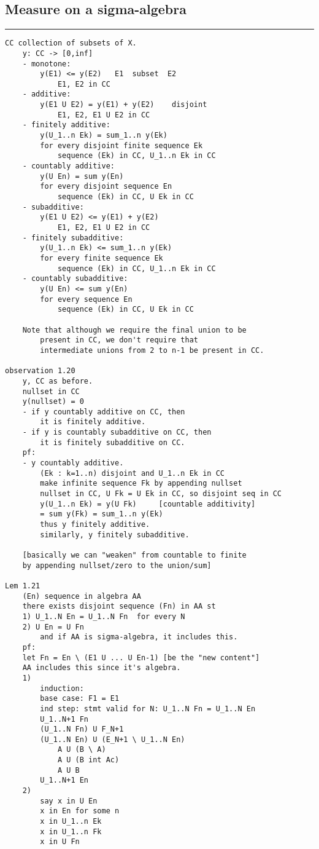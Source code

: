 \documentclass{article}
\begin{document}
\begin{flushleft}
\section*{Measure on a sigma-algebra}
\bigbreak
\hrule
\bigbreak

\begin{verbatim}
CC collection of subsets of X.
    y: CC -> [0,inf] 
    - monotone: 
        y(E1) <= y(E2)   E1  subset  E2 
            E1, E2 in CC
    - additive:
        y(E1 U E2) = y(E1) + y(E2)    disjoint
            E1, E2, E1 U E2 in CC
    - finitely additive: 
        y(U_1..n Ek) = sum_1..n y(Ek) 
        for every disjoint finite sequence Ek 
            sequence (Ek) in CC, U_1..n Ek in CC 
    - countably additive:
        y(U En) = sum y(En)
        for every disjoint sequence En 
            sequence (Ek) in CC, U Ek in CC 
    - subadditive: 
        y(E1 U E2) <= y(E1) + y(E2)
            E1, E2, E1 U E2 in CC
    - finitely subadditive:
        y(U_1..n Ek) <= sum_1..n y(Ek) 
        for every finite sequence Ek 
            sequence (Ek) in CC, U_1..n Ek in CC 
    - countably subadditive:
        y(U En) <= sum y(En)
        for every sequence En 
            sequence (Ek) in CC, U Ek in CC 

    Note that although we require the final union to be 
        present in CC, we don't require that 
        intermediate unions from 2 to n-1 be present in CC. 

observation 1.20
    y, CC as before.
    nullset in CC 
    y(nullset) = 0
    - if y countably additive on CC, then 
        it is finitely additive.
    - if y is countably subadditive on CC, then
        it is finitely subadditive on CC. 
    pf:
    - y countably additive. 
        (Ek : k=1..n) disjoint and U_1..n Ek in CC 
        make infinite sequence Fk by appending nullset 
        nullset in CC, U Fk = U Ek in CC, so disjoint seq in CC
        y(U_1..n Ek) = y(U Fk)     [countable additivity]
        = sum y(Fk) = sum_1..n y(Ek)
        thus y finitely additive. 
        similarly, y finitely subadditive.

    [basically we can "weaken" from countable to finite 
    by appending nullset/zero to the union/sum]

Lem 1.21
    (En) sequence in algebra AA 
    there exists disjoint sequence (Fn) in AA st 
    1) U_1..N En = U_1..N Fn  for every N 
    2) U En = U Fn
        and if AA is sigma-algebra, it includes this.
    pf:
    let Fn = En \ (E1 U ... U En-1) [be the "new content"]
    AA includes this since it's algebra.
    1) 
        induction:
        base case: F1 = E1 
        ind step: stmt valid for N: U_1..N Fn = U_1..N En 
        U_1..N+1 Fn 
        (U_1..N Fn) U F_N+1 
        (U_1..N En) U (E_N+1 \ U_1..N En)
            A U (B \ A)
            A U (B int Ac)
            A U B
        U_1..N+1 En 
    2)
        say x in U En 
        x in En for some n 
        x in U_1..n Ek 
        x in U_1..n Fk
        x in U Fn 


\end{verbatim}
\end{flushleft}
\end{document}
